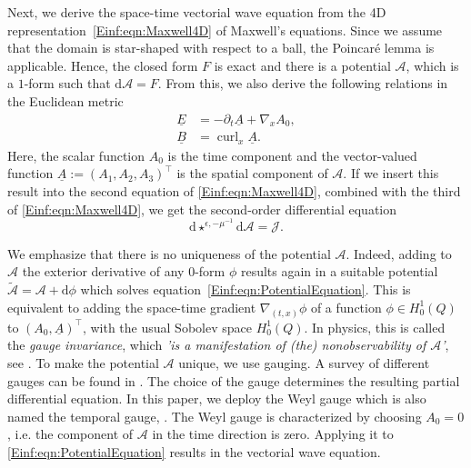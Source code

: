 \documentclass[a4paper,11pt]{article}
\newcommand{\cu}{\operatorname{curl}}
\renewcommand{\vec}[1]{\underline{#1}}
\begin{document}
	Next, we derive the space-time vectorial wave equation from the 4D representation~\eqref{Einf:eqn:Maxwell4D} of Maxwell's equations.
	Since we assume that the domain is star-shaped with respect to a ball, the Poincar\'{e} lemma \cite[Theorem~4.1]{lang} is applicable. Hence, the closed form $F$ is exact and there is a potential $\mathcal A$, which is a $1$-form such that $\mathrm{d}\mathcal A = F.$
	From this, we also derive the following relations in the Euclidean metric 
	\begin{align*}
		\vec E &= -\partial_t \vec{A} +\nabla_x A_0,\\
		\vec B &= \cu_x\vec{A}.
	\end{align*}
	Here, the scalar function $A_0$ is the time component and the vector-valued function $\vec{A}:=(A_1,A_2,A_3)^\top$ is the spatial component of $\mathcal A$. If we insert this result into the second equation of \eqref{Einf:eqn:Maxwell4D}, combined with the third of \eqref{Einf:eqn:Maxwell4D}, we get the second-order differential equation
	\begin{equation}
		\label{Einf:eqn:PotentialEquation}
		\mathrm{d} \star^{\epsilon,-\mu^{-1}} \mathrm{d} \mathcal A =  \mathcal{J}.
	\end{equation}	
	
    We emphasize that there is no uniqueness of the potential $\mathcal A$. Indeed,  adding to $\mathcal A$ the exterior derivative of any $0$-form $\phi$ results again in a suitable potential $\tilde{\mathcal A}= \mathcal A+\mathrm{d}\phi$ which solves equation~\eqref{Einf:eqn:PotentialEquation}. This is equivalent to adding the space-time gradient  $\nabla_{(t,x)} \phi$ of a function $\phi \in H^1_0(Q)$ to $(A_0,\vec A)^\top$, with the usual Sobolev space $H^1_0(Q)$. In physics, this is called the \textit{gauge invariance}, which \textit{'is a manifestation of (the) nonobservability of $\mathcal{A}$'}, see \cite[p.~676]{jackson2001historical}. To make the potential $\mathcal A$ unique, we use gauging. A survey of different gauges can be found in \cite{jackson2001historical}. The choice of the gauge determines the resulting partial differential equation.
    In this paper, we deploy the Weyl gauge which is also named the temporal gauge, \cite{jackson2001historical}. The Weyl gauge is characterized by choosing $A_0=0$, i.e. the component of $\mathcal A$ in the time direction is zero. Applying it to \eqref{Einf:eqn:PotentialEquation} results in the vectorial wave equation.
    
\end{document}
